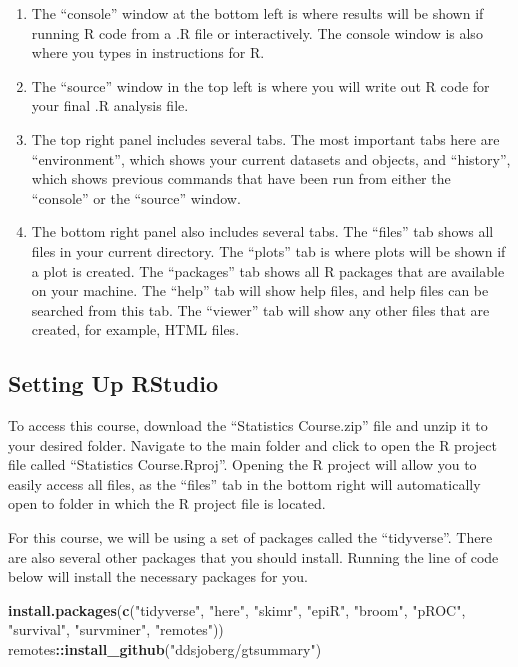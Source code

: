 \documentclass[]{book}
\newenvironment{Shaded}{\begin{snugshade}}{\end{snugshade}}
\newcommand{\KeywordTok}[1]{\textcolor[rgb]{0.13,0.29,0.53}{\textbf{#1}}}
\newcommand{\NormalTok}[1]{#1}
\newcommand{\OperatorTok}[1]{\textcolor[rgb]{0.81,0.36,0.00}{\textbf{#1}}}
\newcommand{\StringTok}[1]{\textcolor[rgb]{0.31,0.60,0.02}{#1}}
\begin{document}
\begin{enumerate}
\def\labelenumi{\arabic{enumi}.}
\item
  The ``console'' window at the bottom left is where results will be
  shown if running R code from a .R file or interactively. The console
  window is also where you types in instructions for R.
\item
  The ``source'' window in the top left is where you will write out R
  code for your final .R analysis file.
\item
  The top right panel includes several tabs. The most important tabs
  here are ``environment'', which shows your current datasets and
  objects, and ``history'', which shows previous commands that have been
  run from either the ``console'' or the ``source'' window.
\item
  The bottom right panel also includes several tabs. The ``files'' tab
  shows all files in your current directory. The ``plots'' tab is where
  plots will be shown if a plot is created. The ``packages'' tab shows
  all R packages that are available on your machine. The ``help'' tab
  will show help files, and help files can be searched from this tab.
  The ``viewer'' tab will show any other files that are created, for
  example, HTML files.
\end{enumerate}

\hypertarget{setting-up-rstudio}{%
\subsection{Setting Up RStudio}\label{setting-up-rstudio}}

To access this course, download the ``Statistics Course.zip'' file and
unzip it to your desired folder. Navigate to the main folder and click
to open the R project file called ``Statistics Course.Rproj''. Opening
the R project will allow you to easily access all files, as the
``files'' tab in the bottom right will automatically open to folder in
which the R project file is located.

For this course, we will be using a set of packages called the
``tidyverse''. There are also several other packages that you should
install. Running the line of code below will install the necessary
packages for you.

\begin{Shaded}
\begin{Highlighting}[]
\KeywordTok{install.packages}\NormalTok{(}\KeywordTok{c}\NormalTok{(}\StringTok{"tidyverse"}\NormalTok{, }\StringTok{"here"}\NormalTok{, }\StringTok{"skimr"}\NormalTok{, }\StringTok{"epiR"}\NormalTok{, }\StringTok{"broom"}\NormalTok{, }\StringTok{"pROC"}\NormalTok{, }\StringTok{"survival"}\NormalTok{, }\StringTok{"survminer"}\NormalTok{, }\StringTok{"remotes"}\NormalTok{))}
\NormalTok{remotes}\OperatorTok{::}\KeywordTok{install_github}\NormalTok{(}\StringTok{"ddsjoberg/gtsummary"}\NormalTok{)}
\end{Highlighting}
\end{Shaded}
\end{document}
